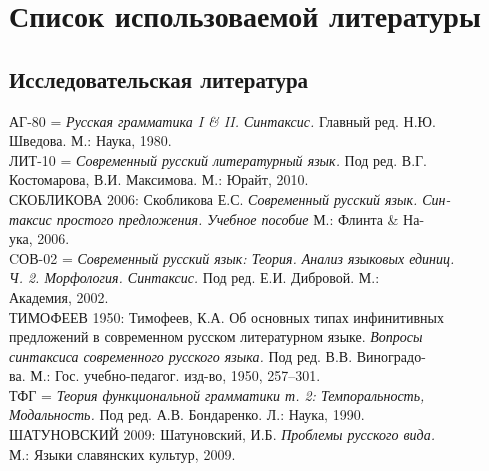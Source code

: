 \newcommand{\indenttext}{\hspace*{4ex}}
\newcommand{\cutline}{\\\indenttext}
\newcommand{\cutword}{-\cutline}

\section*{Список использоваемой литературы}
\setlength{\parindent}{0cm}
\begin{normalsize}
\subsection*{Исследовательская литература}
АГ-80 = \textit{Русская грамматика I \& II. Синтаксис.} Главный ред. Н.Ю.\cutline Шведова. М.: Наука, 1980.\\
ЛИТ-10 = \textit{Современный русский литературный язык.} Под ред. В.Г.\cutline Костомарова, В.И. Максимова. М.: Юрайт, 2010.\\
СКОБЛИКОВА 2006: Скобликова Е.С. \textit{Современный русский язык. Син\cutword таксис простого предложения. Учебное пособие} М.: Флинта \& На\cutword ука, 2006.\\
CОВ-02 = \textit{Современный русский язык: Теория. Анализ языковых единиц.\cutline Ч. 2. Морфология. Синтаксис.} Под ред. Е.И. Дибровой. М.:\cutline Академия, 2002.\\
ТИМОФЕЕВ 1950: Тимофеев, К.А. Об основных типах инфинитивных \indenttext предложений в современном русском литературном языке. \textit{Вопросы \cutline синтаксиса современного русского языка.} Под ред. В.В. Виноградо\cutword ва. М.: Гос. учебно-педагог. изд-во, 1950, 257--301.\\
ТФГ = \textit{Теория функциональной грамматики т. 2: Темпоральность, \cutline Модальность.} Под ред. А.В. Бондаренко. Л.: Наука, 1990.\\
ШАТУНОВСКИЙ 2009: Шатуновский, И.Б. \textit{Проблемы русского вида.} \cutline М.: Языки славянских культур, 2009.
\end{normalsize}